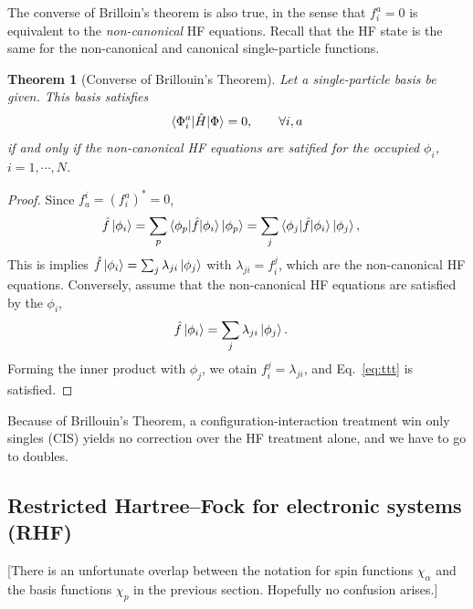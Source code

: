 \documentclass{report}
\theoremstyle{plain}
\newtheorem{theorem}{Theorem}[chapter]
\theoremstyle{definition}
\begin{document}
The converse of Brilloin's theorem is also true, in the sense that
$f^a_i=0$ is equivalent to the \emph{non-canonical} HF
equations. Recall that the HF state is the same for the non-canonical
and canonical single-particle functions.
\begin{theorem}[Converse of Brillouin's Theorem]\label{thm:brillouin-converse}
  Let a single-particle basis be given. This basis satisfies
  \begin{equation} \label{eq:hf-singles}
    \braket{\Phi_{i}^a|\hat{H}|\Phi} = 0,\qquad \forall i,a
  \end{equation}
  if and only if the non-canonical HF equations are satified for the
  occupied $\phi_i$, $i=1,\cdots,N$.
\end{theorem}
\begin{proof}
  Since $f^i_a = (f^a_i)^* = 0$,
  \begin{align}
    \hat{f}\ket{\phi_i} &= \sum_p \braket{\phi_p|\hat{f}|\phi_i}\ket{\phi_p} =
    \sum_j \braket{\phi_j|\hat{f}|\phi_i}\ket{\phi_j}\label{eq:ttt}
    , %
  \end{align}
  This is implies $\hat{f}\ket{\phi_i} = \sum_j
  \lambda_{ji} \ket{\phi_j}$ with $\lambda_{ji} = f^j_i$, which are
  the non-canonical HF equations. Conversely, assume that the
  non-canonical HF equations are satisfied by the $\phi_i$,
  \begin{align}
    \hat{f}\ket{\phi_i} &= \sum_j \lambda_{ji} \ket{\phi_j}.
  \end{align}
  Forming the inner product with $\phi_j$, we otain $f^j_i =
  \lambda_{ji}$, and Eq.~\eqref{eq:ttt} is satisfied.
\end{proof}


Because of Brillouin's Theorem, a configuration-interaction treatment
win only singles (CIS) yields no correction over the HF treatment
alone, and we have to go to doubles.

\subsection{Restricted Hartree--Fock for electronic systems (RHF)}


[There is an unfortunate overlap between the notation for spin
functions $\chi_\alpha$ and the basis functions $\chi_p$ in the
previous section. Hopefully no confusion arises.]
\end{document}
